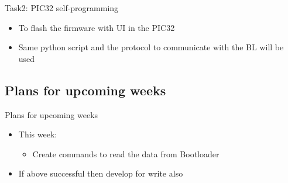 \documentclass{beamer}
\begin{document}
\begin{frame}{Task2: PIC32 self-programming}
	\begin{itemize}
		\item To flash the firmware with UI in the PIC32
		\item Same python script and the protocol to communicate with the BL will be used
	\end{itemize}	
\end{frame}

\subsection{Plans for upcoming weeks}

\begin{frame}{Plans for upcoming weeks}
	\begin{itemize}
		\item This week:
			\begin{itemize}
				\item Create commands to read the data from Bootloader
			\end{itemize}
		\item If above successful then develop for write also
	\end{itemize}		
\end{frame}
\end{document}
